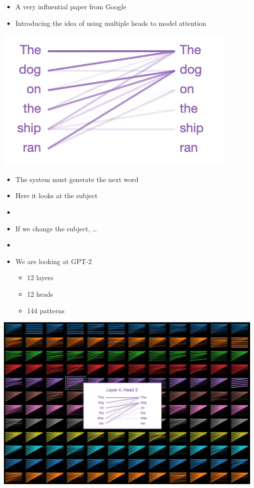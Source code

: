 \documentclass[25pt,a4paper,landscape,headrule,footrule,xetex]{foils}
\begin{document}
\begin{itemize}
\item A very influential paper from Google \citep{NIPS2017_3f5ee243}
\item Introducing the idea of using multiple heads to model attention
\end{itemize}

\noindent\includegraphics[width=\linewidth]{../pics/attention_dog.png}

\begin{itemize}
\item The system must generate the next word
\item Here it looks at the subject
\item {}
\item If we change the subject, \ldots
\item {}
\item We are looking at GPT-2
  \begin{itemize}
  \item 12 layers
  \item 12 heads
  \item 144 patterns
  \end{itemize}
\end{itemize}


\noindent\includegraphics[width=\linewidth]{../pics/attention_layer4_head3.png}
\end{document}
